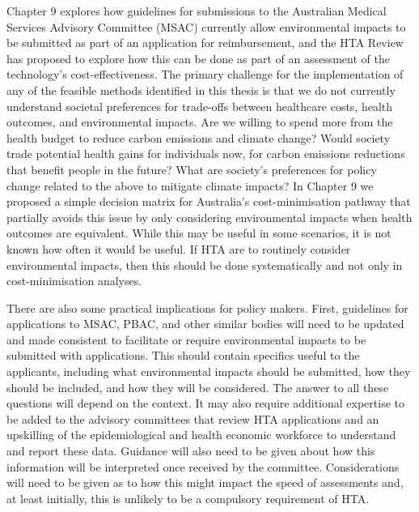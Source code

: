 \begin{refsection}
Chapter 9 explores how guidelines for submissions to the Australian Medical Services Advisory Committee (MSAC) currently allow environmental impacts to be submitted as part of an application for reimbursement, and the HTA Review has proposed to explore how this can be done as part of an assessment of the technology’s cost-effectiveness. The primary challenge for the implementation of any of the feasible methods identified in this thesis is that we do not currently understand societal preferences for trade-offs between healthcare costs, health outcomes, and environmental impacts. Are we willing to spend more from the health budget to reduce carbon emissions and climate change? Would society trade potential health gains for individuals now, for carbon emissions reductions that benefit people in the future? What are society’s preferences for policy change related to the above to mitigate climate impacts? In Chapter 9 we proposed a simple decision matrix for Australia’s cost-minimisation pathway that partially avoids this issue by only considering environmental impacts when health outcomes are equivalent. While this may be useful in some scenarios, it is not known how often it would be useful. If HTA are to routinely consider environmental impacts, then this should be done systematically and not only in cost-minimisation analyses. 

There are also some practical implications for policy makers. First, guidelines for applications to MSAC, PBAC, and other similar bodies will need to be updated and made consistent to facilitate or require environmental impacts to be submitted with applications. This should contain specifics useful to the applicants, including what environmental impacts should be submitted, how they should be included, and how they will be considered. The answer to all these questions will depend on the context. It may also require additional expertise to be added to the advisory committees that review HTA applications and an upskilling of the epidemiological and health economic workforce to understand and report these data. Guidance will also need to be given about how this information will be interpreted once received by the committee. Considerations will need to be given as to how this might impact the speed of assessments and, at least initially, this is unlikely to be a compulsory requirement of HTA.


\end{refsection}

